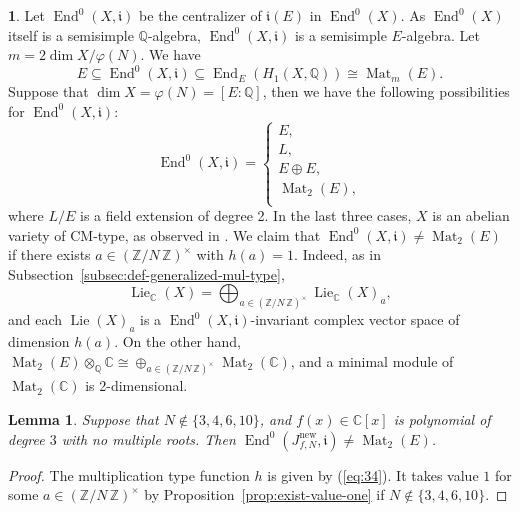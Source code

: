\documentclass{amsart}[11pt]
\newtheorem{lem}[thm]{Lemma}
\theoremstyle{definition}
\newtheorem{sect}[thm]{}
\numberwithin{equation}{section}
\theoremstyle{notitle}
\begin{document}
\begin{sect}
  Let $\operatorname{End}^0(X, {\mathfrak{i}})$ be the centralizer of ${\mathfrak{i}}(E)$ in
  $\operatorname{End}^0(X)$. As $\operatorname{End}^0(X)$ itself is a semisimple ${\mathbb{Q}}$-algebra,
  $\operatorname{End}^0(X, {\mathfrak{i}})$ is a semisimple $E$-algebra. Let $m=2\dim
  X/\varphi(N)$. We have
 \[  E \subseteq  \operatorname{End}^0(X, {\mathfrak{i}}) \subseteq \operatorname{End}_E(H_1(X, {\mathbb{Q}}))\cong
 \operatorname{Mat}_m(E).\] 
Suppose that $\dim X= \varphi(N)=[E:{\mathbb{Q}}]$, then we have the following
possibilities for $\operatorname{End}^0(X, {\mathfrak{i}})$:
\begin{equation}
  \label{eq:28}
 \operatorname{End}^0(X, {\mathfrak{i}})=
 \begin{cases}
   E, \\
   L, \\
   E\oplus E,\\
   \operatorname{Mat}_2(E),\\
 \end{cases}
\end{equation}
where $L/E$ is a field extension of degree 2. In the last three cases,
$X$ is an abelian variety of CM-type, as observed in
\cite[Theorem 3.1]{MR2349666}. We claim that $\operatorname{End}^0(X,
{\mathfrak{i}})\neq \operatorname{Mat}_2(E)$ if there exists $a\in {(\mathbb{Z}/ {N}\, \mathbb{Z})^\times}$ with
$h(a)=1$. Indeed, as in
Subsection~\ref{subsec:def-generalized-mul-type},\[\operatorname{Lie}_{\mathbb{C}}(X)=\bigoplus_{a\in
  {(\mathbb{Z}/ {N}\, \mathbb{Z})^\times}}\operatorname{Lie}_{\mathbb{C}}(X)_a,\] and each $\operatorname{Lie}(X)_a$ is a $\operatorname{End}^0(X,
{\mathfrak{i}})$-invariant complex vector space of dimension $h(a)$. On the other
hand, $\operatorname{Mat}_2(E)\otimes_{\mathbb{Q}} {\mathbb{C}}\cong \oplus_{a\in {(\mathbb{Z}/ {N}\, \mathbb{Z})^\times}}
\operatorname{Mat}_2({\mathbb{C}})$, and a minimal module of $\operatorname{Mat}_2({\mathbb{C}})$ is 2-dimensional.
\end{sect}
\begin{lem}\label{lem:centralizer-is-not-matrix-algebra}
Suppose that $N\not \in \{3, 4, 6, 10\}$, and $f(x)\in {\mathbb{C}}[x]$ is
polynomial of degree $3$ with no multiple roots. Then
$\operatorname{End}^0(J_{f,N}^{\mathrm{new}}, {\mathfrak{i}})\neq \operatorname{Mat}_2(E)$. 
\end{lem}
\begin{proof}
  The multiplication type function $h$ is given by (\ref{eq:34}). It
  takes value $1$ for some $a\in {(\mathbb{Z}/ {N}\, \mathbb{Z})^\times}$ by
  Proposition~\ref{prop:exist-value-one} if $N\not\in \{3, 4, 6,
  10\}$. 
\end{proof}
\end{document}
